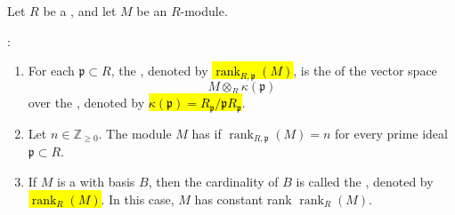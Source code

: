 \begin{definition} \label{definition:rank_of_a_module_over_a_commutative_ring}
Let $R$ be a , and let $M$ be an $R$-module.

:
\begin{enumerate}[label=(\alph*)]
    \item For each  $\mathfrak{p} \subset R$, the , denoted by \hl{$\operatorname{rank}_{R,\mathfrak{p}}(M)$}, is the  of the vector space
    $$M \otimes_R \kappa(\mathfrak{p})$$
    over the , denoted by \hl{$\kappa(\mathfrak{p}) = R_\mathfrak{p}/\mathfrak{p}R_\mathfrak{p}$}.

    \item Let $n \in \mathbb{Z}_{\geq 0}$. The module $M$ has  if $\operatorname{rank}_{R,\mathfrak{p}}(M) = n$ for every prime ideal $\mathfrak{p} \subset R$.

    \item If $M$ is a  with basis $B$, then the cardinality of $B$ is called the , denoted by \hl{$\operatorname{rank}_R(M)$}. In this case, $M$ has constant rank $\operatorname{rank}_R(M)$.
\end{enumerate}
\end{definition}
